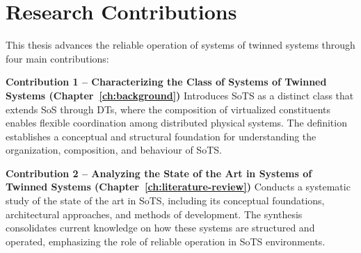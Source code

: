 
\section*{Research Contributions}

This thesis advances the reliable operation of systems of twinned systems through four main contributions:

\textbf{Contribution 1 – Characterizing the Class of Systems of Twinned Systems (Chapter~\ref{ch:background})}  
Introduces SoTS as a distinct class that extends SoS through DTs, where the composition of virtualized constituents enables flexible coordination among distributed physical systems. The definition establishes a conceptual and structural foundation for understanding the organization, composition, and behaviour of SoTS.

\textbf{Contribution 2 – Analyzing the State of the Art in Systems of Twinned Systems (Chapter~\ref{ch:literature-review})}  
Conducts a systematic study of the state of the art in SoTS, including its conceptual foundations, architectural approaches, and methods of development. The synthesis consolidates current knowledge on how these systems are structured and operated, emphasizing the role of reliable operation in SoTS environments.

